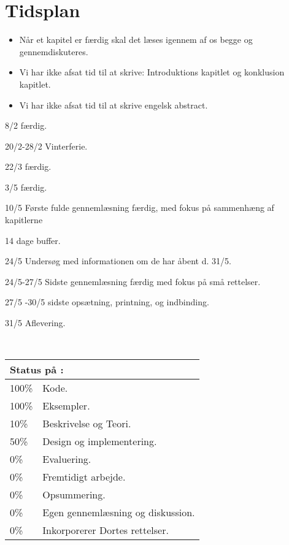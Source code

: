 \chapter{Tidsplan}

\begin{itemize}\tightlist
\item Når et kapitel er færdig skal det læses igennem af os begge og gennemdiskuteres.
\item Vi har ikke afsat tid til at skrive: Introduktions kapitlet og konklusion kapitlet.
\item Vi har ikke afsat tid til at skrive engelsk abstract.
\end{itemize}

\begin{list}{}{}
\tightlist 
\item [8/2] \des færdig.
\item [20/2-28/2] Vinterferie.
\item [22/3] \ds færdig.
\item [3/5] \is færdig.
\item [10/5] Første fulde gennemlæsning færdig, med fokus på sammenhæng af kapitlerne
\item [14 dage buffer.]
\item[24/5] Undersøg med informationen om de har åbent d. 31/5.
\item [24/5-27/5] Sidste gennemlæsning færdig med fokus på små rettelser.
\item [27/5 -30/5] sidste opsætning, printning, og indbinding.
\item [31/5] Aflevering. 
\end{list}\
\begin{tabular}{m{0.5cm}m{5cm}}
\hline  
\multicolumn{2}{m{4.5cm}}{\textbf{Status på \des:}} \\
\hline
100\% & Kode.  \\ 
100\% & Eksempler.\\
10\% & Beskrivelse og Teori.\\ %
50\% & Design og  implementering. \\ %
0\% & Evaluering. \\ %
0\% & Fremtidigt arbejde. \\ %
0\% & Opsummering. \\ %
0\% & Egen gennemlæsning og diskussion. \\ %
0\% & Inkorporerer Dortes rettelser. \\ %
\hline
\end{tabular}
